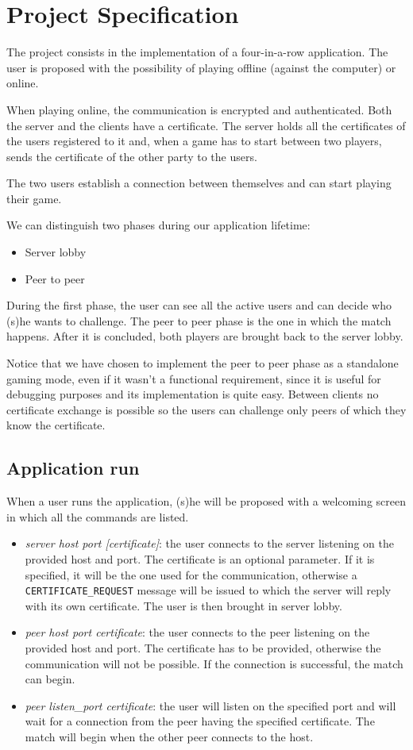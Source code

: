 \section{Project Specification}
The project consists in the implementation of a four-in-a-row application. 
The user is proposed with the possibility of playing offline (against the computer) or online.

When playing online, the communication is encrypted and authenticated.
Both the server and the clients have a certificate. The server holds all the certificates of the users registered to it and, when a game has to start between two players, sends the certificate of the other party to the users.

The two users establish a connection between themselves and can start playing their game.

We can distinguish two phases during our application lifetime:
\begin{itemize}
	\item Server lobby
	\item Peer to peer
\end{itemize}

During the first phase, the user can see all the active users and can decide who (s)he wants to challenge.
The peer to peer phase is the one in which the match happens. After it is concluded, both players are brought back to the server lobby.

Notice that we have chosen to implement the peer to peer phase as a standalone gaming mode, even if it wasn't a functional requirement, since it is useful for debugging purposes and its implementation is quite easy. Between clients no certificate exchange is possible so the users can challenge only peers of which they know the certificate.

\subsection{Application run}
When a user runs the application, (s)he will be proposed with a welcoming screen in which all the commands are listed.
\begin{itemize}
	\item \textit{server host port [certificate]}: the user connects to the server listening on the provided host and port. The certificate is an optional parameter. If it is specified, it will be the one used for the communication, otherwise a \texttt{CERTIFICATE\_REQUEST} message will be issued to which the server will reply with its own certificate. The user is then brought in server lobby.
	\item \textit{peer host port certificate}: the user connects to the peer listening on the provided host and port. The certificate has to be provided, otherwise the communication will not be possible. If the connection is successful, the match can begin.
	\item \textit{peer listen\_port certificate}: the user will listen on the specified port and will wait for a connection from the peer having the specified certificate. The match will begin when the other peer connects to the host.
\end{itemize}

